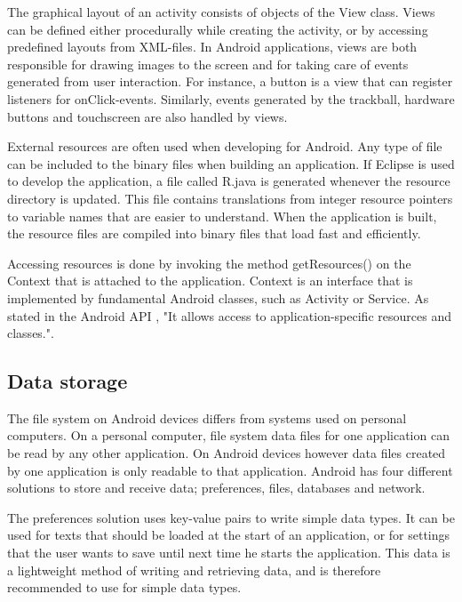 The graphical layout of an activity consists of objects of the View class. Views can be defined either procedurally while creating the activity, or by accessing predefined layouts from XML-files. In Android applications, views are both responsible for drawing images to the screen and for taking care of events generated from user interaction. For instance, a button is a view that can register listeners for onClick-events. Similarly, events generated by the trackball, hardware buttons and touchscreen are also handled by views.

External resources are often used when developing for Android. Any type of file can be included to the binary files when building an application. If Eclipse is used to develop the application, a file called R.java is generated whenever the resource directory is updated. This file contains translations from integer resource pointers to variable names that are easier to understand. When the application is built, the resource files are compiled into binary files that load fast and efficiently. \citep{Android}
 
Accessing resources is done by invoking the method getResources() on the Context that is attached to the application. Context is an interface that is implemented by fundamental Android classes, such as Activity or Service. As stated in the Android API \citep{Android}, "It allows access to application-specific resources and classes.".

\subsection{Data storage}

The file system on Android devices differs from systems used on personal computers. On a personal computer, file system data files for one application can be read by any other application. On Android devices however data files created by one application is only readable to that application. Android has four different solutions to store and receive data; preferences, files, databases and network. \citep{Android} 

The preferences solution uses key-value pairs to write simple data types. It can be used for texts that should be loaded at the start of an application, or for settings that the user wants to save until next time he starts the application. This data is a lightweight method of writing and retrieving data, and is therefore recommended to use for simple data types. \citep{Android}

